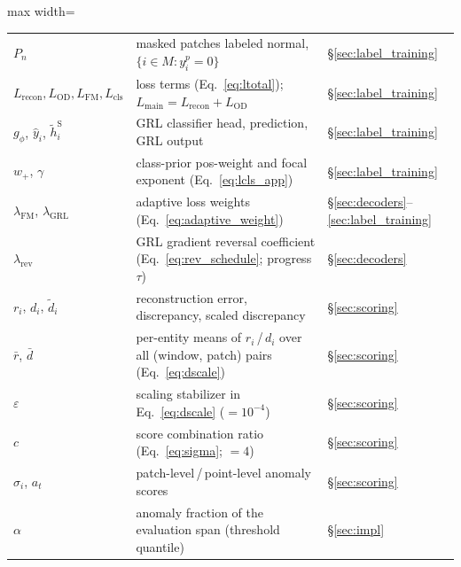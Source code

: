 \begin{table}[tp]
\begin{adjustbox}{max width=\linewidth}
\begin{tabular}{lll}
$P_n$ & masked patches labeled normal, $\{i \in M : y^p_i = 0\}$ & \S\ref{sec:label_training} \\
$L_{\mathrm{recon}}, L_{\mathrm{OD}}, L_{\mathrm{FM}}, L_{\mathrm{cls}}$ & loss terms (Eq.~\ref{eq:ltotal}); $L_{\mathrm{main}} = L_{\mathrm{recon}} + L_{\mathrm{OD}}$ & \S\ref{sec:label_training} \\
$g_\phi$, $\hat{y}_i$, $\tilde{h}^{\mathrm{S}}_i$ & GRL classifier head, prediction, GRL output & \S\ref{sec:label_training} \\
$w_+$, $\gamma$ & class-prior pos-weight and focal exponent (Eq.~\ref{eq:lcls_app}) & \S\ref{sec:label_training} \\
$\lambda_{\mathrm{FM}}$, $\lambda_{\mathrm{GRL}}$ & adaptive loss weights (Eq.~\ref{eq:adaptive_weight}) & \S\ref{sec:decoders}--\ref{sec:label_training} \\
$\lambda_{\mathrm{rev}}$ & GRL gradient reversal coefficient (Eq.~\ref{eq:rev_schedule}; progress $\tau$) & \S\ref{sec:decoders} \\
$r_i$, $d_i$, $\tilde{d}_i$ & reconstruction error, discrepancy, scaled discrepancy & \S\ref{sec:scoring} \\
$\bar{r}$, $\bar{d}$ & per-entity means of $r_i$\,/\,$d_i$ over all (window, patch) pairs (Eq.~\ref{eq:dscale}) & \S\ref{sec:scoring} \\
$\varepsilon$ & scaling stabilizer in Eq.~\ref{eq:dscale} ($= 10^{-4}$) & \S\ref{sec:scoring} \\
$c$ & score combination ratio (Eq.~\ref{eq:sigma}; $= 4$) & \S\ref{sec:scoring} \\
$\sigma_i$, $a_t$ & patch-level\,/\,point-level anomaly scores & \S\ref{sec:scoring} \\
$\alpha$ & anomaly fraction of the evaluation span (threshold quantile) & \S\ref{sec:impl} \\
\bottomrule
\end{tabular}
\end{adjustbox}
\end{table}
